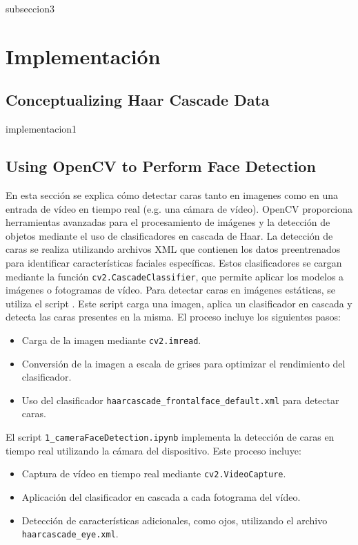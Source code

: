 \documentclass[a4paper]{article}
\begin{document}
subseccion3

\section{Implementación}

\subsection{Conceptualizing Haar Cascade Data}

implementacion1

\subsection{Using OpenCV to Perform Face Detection}

En esta sección se explica cómo detectar caras tanto en imagenes como en una entrada de vídeo en tiempo real (e.g. una cámara de vídeo).
OpenCV proporciona herramientas avanzadas para el procesamiento de imágenes y la detección de objetos mediante el uso de clasificadores en cascada de Haar.\newline
La detección de caras se realiza utilizando archivos XML que contienen los datos preentrenados para identificar características faciales específicas. Estos clasificadores se cargan mediante la función \texttt{cv2.CascadeClassifier}, que permite aplicar los modelos a imágenes o fotogramas de vídeo.
Para detectar caras en imágenes estáticas, se utiliza el script \texttt{}. Este script carga una imagen, aplica un clasificador en cascada y detecta las caras presentes en la misma. El proceso incluye los siguientes pasos:

\begin{itemize}
    \item Carga de la imagen mediante \texttt{cv2.imread}.
    \item Conversión de la imagen a escala de grises para optimizar el rendimiento del clasificador.
    \item Uso del clasificador \texttt{haarcascade\_frontalface\_default.xml} para detectar caras.
\end{itemize}

El script \texttt{1\_cameraFaceDetection.ipynb} implementa la detección de caras en tiempo real utilizando la cámara del dispositivo. Este proceso incluye:
\begin{itemize}
    \item Captura de vídeo en tiempo real mediante \texttt{cv2.VideoCapture}.
    \item Aplicación del clasificador en cascada a cada fotograma del vídeo.
    \item Detección de características adicionales, como ojos, utilizando el archivo \texttt{haarcascade\_eye.xml}.
\end{itemize}
\end{document}

